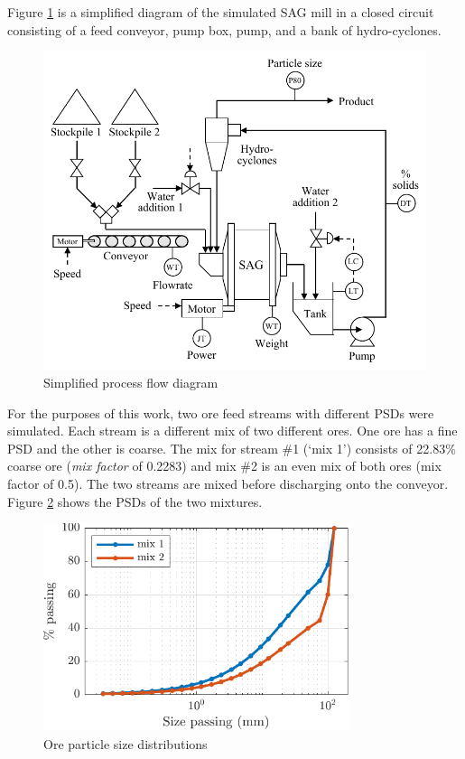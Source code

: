 Figure \ref{fig:sag-diag} is a simplified diagram of the simulated \acrshort{SAG} mill in a closed circuit consisting of a feed conveyor, pump box, pump, and a bank of hydro-cyclones.
\begin{figure}[ht]
	\centering
	\includegraphics[width=12.5cm]{images/sag-circuit-diag.pdf}
	\caption{Simplified process flow diagram}
	\label{fig:sag-diag}
\end{figure}
For the purposes of this work, two ore feed streams with different \gls{PSD}s were simulated. Each stream is a different mix of two different ores. One ore has a fine \gls{PSD} and the other is coarse. The mix for stream \#1 (`mix 1') consists of 22.83\% coarse ore (\textit{mix factor} of 0.2283) and mix \#2 is an even mix of both ores (mix factor of 0.5). The two streams are mixed before discharging onto the conveyor. Figure \ref{fig:coarse_fine_psd_plot} shows the \gls{PSD}s of the two mixtures.
\begin{figure}[ht]
	\centering
	\includegraphics[width=9cm]{images/coarse_fine_cumpsd_plot.pdf}
	\caption{Ore particle size distributions}
	\label{fig:coarse_fine_psd_plot}
\end{figure}

